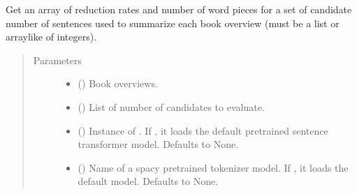 \documentclass[letterpaper,10pt,english]{sphinxmanual}
\begin{document}
\begin{fulllineitems}
\label{\detokenize{code:experiment_text_summarization.evaluate_summarization_candidates}}
Get an array of reduction rates and number of word pieces for a set of
candidate number of sentences used to summarize each book overview (must 
be a list or array\sphinxhyphen{}like of integers).
\begin{quote}\begin{description}
\item[{Parameters}] \leavevmode\begin{itemize}
\item {} 
 () \textendash{} Book overviews.

\item {} 
 () \textendash{} List of number of candidates to evaluate.

\item {} 
 (\sphinxstyleliteralemphasis{\sphinxupquote{, }}) \textendash{} Instance of . If , it loads the default
pretrained sentence transformer model. Defaults to None.

\item {} 
 (\sphinxstyleliteralemphasis{\sphinxupquote{, }}) \textendash{} Name of a spacy pretrained tokenizer model. If , it
loads the default model. Defaults to None.


\end{itemize}
\end{description}
\end{quote}
\end{fulllineitems}
\end{document}
